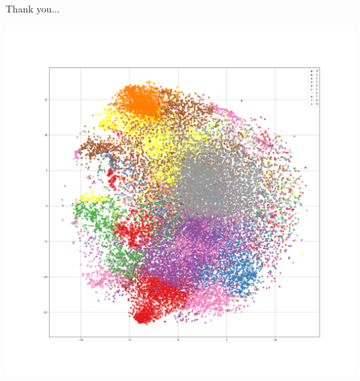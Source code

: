 \documentclass[usenames,dvipsnames]{beamer}
\begin{document}
\begin{frame}
    Thank you...
\end{frame}





\begin{frame}
  \includegraphics[width=\textwidth]{imagenes_cnn/Tsne_alpha90_cluster10.png}
\end{frame}




%
\end{document}
